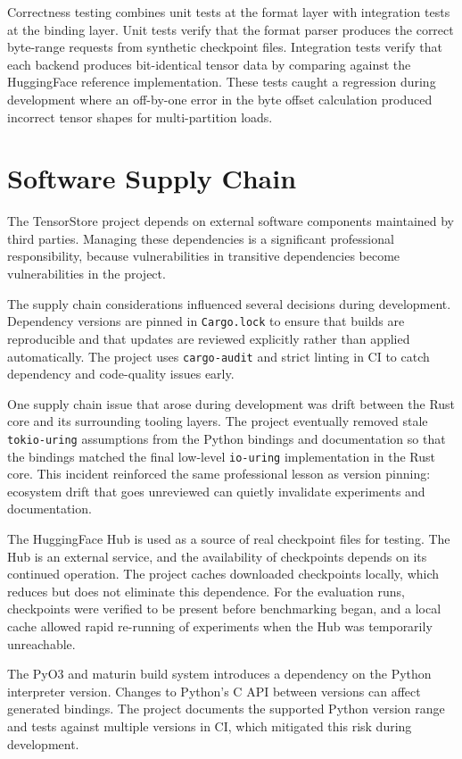 Correctness testing combines unit tests at the format layer with integration tests at the binding layer. Unit tests verify that the format parser produces the correct byte-range requests from synthetic checkpoint files. Integration tests verify that each backend produces bit-identical tensor data by comparing against the HuggingFace reference implementation. These tests caught a regression during development where an off-by-one error in the byte offset calculation produced incorrect tensor shapes for multi-partition loads.

\section{Software Supply Chain}

The TensorStore project depends on external software components maintained by third parties. Managing these dependencies is a significant professional responsibility, because vulnerabilities in transitive dependencies become vulnerabilities in the project.

The supply chain considerations influenced several decisions during development. Dependency versions are pinned in \texttt{Cargo.lock} to ensure that builds are reproducible and that updates are reviewed explicitly rather than applied automatically. The project uses \texttt{cargo-audit} and strict linting in CI to catch dependency and code-quality issues early.

One supply chain issue that arose during development was drift between the Rust core and its surrounding tooling layers. The project eventually removed stale \texttt{tokio-uring} assumptions from the Python bindings and documentation so that the bindings matched the final low-level \texttt{io-uring} implementation in the Rust core. This incident reinforced the same professional lesson as version pinning: ecosystem drift that goes unreviewed can quietly invalidate experiments and documentation.

The HuggingFace Hub is used as a source of real checkpoint files for testing. The Hub is an external service, and the availability of checkpoints depends on its continued operation. The project caches downloaded checkpoints locally, which reduces but does not eliminate this dependence. For the evaluation runs, checkpoints were verified to be present before benchmarking began, and a local cache allowed rapid re-running of experiments when the Hub was temporarily unreachable.

The PyO3 and maturin build system introduces a dependency on the Python interpreter version. Changes to Python's C API between versions can affect generated bindings. The project documents the supported Python version range and tests against multiple versions in CI, which mitigated this risk during development.

